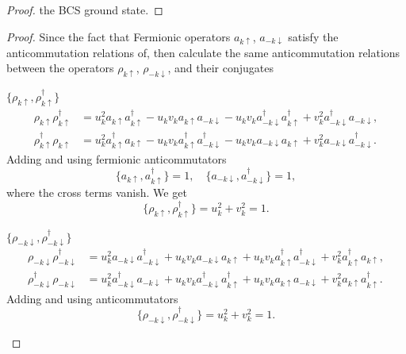 \begin{solution}
\begin{enumext}
\begin{proof}
      the BCS ground state.
    \end{proof}
    \item \begin{proof}
    Since the fact that Fermionic operators $a_{k\uparrow}$, $a_{-k\downarrow}$
    satisfy the anticommutation relations of, then calculate the same
    anticommutation relations between the operators
    $\rho_{k\uparrow}$, $\rho_{-k\downarrow}$, and their conjugates
    \begin{enumext}
      \item $\{\rho_{k\uparrow}, \rho_{k\uparrow}^\dagger\}$
      \begin{align*}
        \rho_{k\uparrow} \rho_{k\uparrow}^\dagger
      & = u_k^2 a_{k\uparrow} a_{k\uparrow}^\dagger
        - u_k v_k a_{k\uparrow} a_{-k\downarrow}
        - u_k v_k a_{-k\downarrow}^\dagger a_{k\uparrow}^\dagger
        + v_k^2 a_{-k\downarrow}^\dagger a_{-k\downarrow}, \\
        \rho_{k\uparrow}^\dagger \rho_{k\uparrow}
      & = u_k^2 a_{k\uparrow}^\dagger a_{k\uparrow}
        - u_k v_k a_{k\uparrow}^\dagger a_{-k\downarrow}^\dagger
        - u_k v_k a_{-k\downarrow} a_{k\uparrow}
        + v_k^2 a_{-k\downarrow} a_{-k\downarrow}^\dagger.
      \end{align*}
      Adding and using fermionic anticommutators
      \[
        \{a_{k\uparrow}, a_{k\uparrow}^\dagger\} = 1, \quad
        \{a_{-k\downarrow}, a_{-k\downarrow}^\dagger\} = 1,
      \]
      where the cross terms vanish. We get
      \[
        \{\rho_{k\uparrow}, \rho_{k\uparrow}^\dagger\} = u_k^2 + v_k^2 = 1.
      \]
      \item $\{\rho_{-k\downarrow}, \rho_{-k\downarrow}^\dagger\}$
      \begin{align*}
        \rho_{-k\downarrow} \rho_{-k\downarrow}^\dagger
    & = u_k^2 a_{-k\downarrow} a_{-k\downarrow}^\dagger
      + u_k v_k a_{-k\downarrow} a_{k\uparrow}
      + u_k v_k a_{k\uparrow}^\dagger a_{-k\downarrow}^\dagger
      + v_k^2 a_{k\uparrow}^\dagger a_{k\uparrow}, \\
        \rho_{-k\downarrow}^\dagger \rho_{-k\downarrow}
    & = u_k^2 a_{-k\downarrow}^\dagger a_{-k\downarrow}
      + u_k v_k a_{-k\downarrow}^\dagger a_{k\uparrow}^\dagger
      + u_k v_k a_{k\uparrow} a_{-k\downarrow}
      + v_k^2 a_{k\uparrow} a_{k\uparrow}^\dagger.
      \end{align*}
      Adding and using anticommutators
      \[
        \{\rho_{-k\downarrow}, \rho_{-k\downarrow}^\dagger\}
      = u_k^2 + v_k^2 = 1.
\]
\end{enumext}
\end{proof}
\end{enumext}
\end{solution}
